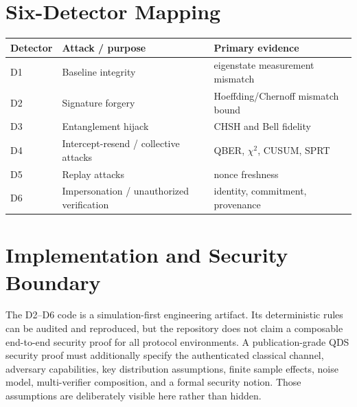 \documentclass[11pt,a4paper]{article}
\begin{document}
\section{Six-Detector Mapping}
\begin{longtable}{lll}
\toprule
Detector & Attack / purpose & Primary evidence\\
\midrule
D1 & Baseline integrity & eigenstate measurement mismatch\\
D2 & Signature forgery & Hoeffding/Chernoff mismatch bound\\
D3 & Entanglement hijack & CHSH and Bell fidelity\\
D4 & Intercept-resend / collective attacks & QBER, $\chi^2$, CUSUM, SPRT\\
D5 & Replay attacks & nonce freshness\\
D6 & Impersonation / unauthorized verification & identity, commitment, provenance\\
\bottomrule
\end{longtable}

\section{Implementation and Security Boundary}
The D2--D6 code is a simulation-first engineering artifact. Its deterministic
rules can be audited and reproduced, but the repository does not claim a
composable end-to-end security proof for all protocol environments. A
publication-grade QDS security proof must additionally specify the authenticated
classical channel, adversary capabilities, key distribution assumptions, finite
sample effects, noise model, multi-verifier composition, and a formal security
notion. Those assumptions are deliberately visible here rather than hidden.
\end{document}
